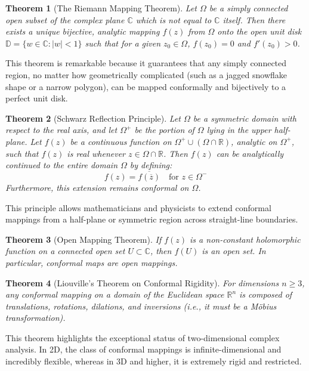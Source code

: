 \documentclass[12pt,a4paper]{article}
\newtheorem{theorem}{Theorem}[section]
\begin{document}
\begin{theorem}[The Riemann Mapping Theorem]
Let $\Omega$ be a simply connected open subset of the complex plane $\mathbb{C}$ which is not equal to $\mathbb{C}$ itself. Then there exists a unique bijective, analytic mapping $f(z)$ from $\Omega$ onto the open unit disk $\mathbb{D} = \{w \in \mathbb{C} : |w| < 1\}$ such that for a given $z_0 \in \Omega$, $f(z_0) = 0$ and $f'(z_0) > 0$.
\end{theorem}
This theorem is remarkable because it guarantees that any simply connected region, no matter how geometrically complicated (such as a jagged snowflake shape or a narrow polygon), can be mapped conformally and bijectively to a perfect unit disk.

\begin{theorem}[Schwarz Reflection Principle]
Let $\Omega$ be a symmetric domain with respect to the real axis, and let $\Omega^+$ be the portion of $\Omega$ lying in the upper half-plane. Let $f(z)$ be a continuous function on $\Omega^+ \cup (\Omega \cap \mathbb{R})$, analytic on $\Omega^+$, such that $f(z)$ is real whenever $z \in \Omega \cap \mathbb{R}$. Then $f(z)$ can be analytically continued to the entire domain $\Omega$ by defining:
\begin{equation}
    f(z) = \overline{f(\overline{z})} \quad \text{for } z \in \Omega^-
\end{equation}
Furthermore, this extension remains conformal on $\Omega$.
\end{theorem}
This principle allows mathematicians and physicists to extend conformal mappings from a half-plane or symmetric region across straight-line boundaries.

\begin{theorem}[Open Mapping Theorem]
If $f(z)$ is a non-constant holomorphic function on a connected open set $U \subset \mathbb{C}$, then $f(U)$ is an open set. In particular, conformal maps are open mappings.
\end{theorem}

\begin{theorem}[Liouville's Theorem on Conformal Rigidity]
For dimensions $n \ge 3$, any conformal mapping on a domain of the Euclidean space $\mathbb{R}^n$ is composed of translations, rotations, dilations, and inversions (i.e., it must be a M\"obius transformation).
\end{theorem}
This theorem highlights the exceptional status of two-dimensional complex analysis. In 2D, the class of conformal mappings is infinite-dimensional and incredibly flexible, whereas in 3D and higher, it is extremely rigid and restricted.
\end{document}

